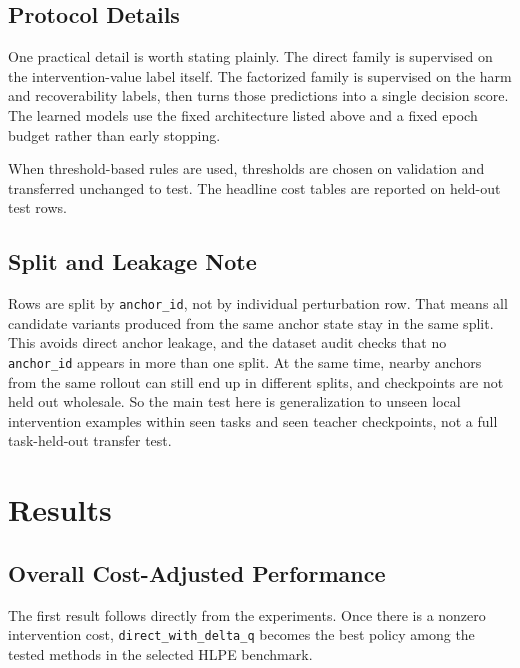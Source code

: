 \documentclass[11pt]{article}
\begin{document}
\subsection*{Protocol Details}

One practical detail is worth stating plainly. The direct family is supervised on the intervention-value label itself. The factorized family is supervised on the harm and recoverability labels, then turns those predictions into a single decision score. The learned models use the fixed architecture listed above and a fixed epoch budget rather than early stopping.

When threshold-based rules are used, thresholds are chosen on validation and transferred unchanged to test. The headline cost tables are reported on held-out test rows.

\subsection*{Split and Leakage Note}

Rows are split by \texttt{anchor\_id}, not by individual perturbation row. That means all candidate variants produced from the same anchor state stay in the same split. This avoids direct anchor leakage, and the dataset audit checks that no \texttt{anchor\_id} appears in more than one split. At the same time, nearby anchors from the same rollout can still end up in different splits, and checkpoints are not held out wholesale. So the main test here is generalization to unseen local intervention examples within seen tasks and seen teacher checkpoints, not a full task-held-out transfer test.

\section{Results}

\subsection*{Overall Cost-Adjusted Performance}

The first result follows directly from the experiments. Once there is a nonzero intervention cost, \texttt{direct\_with\_delta\_q} becomes the best policy among the tested methods in the selected HLPE benchmark.
\end{document}
